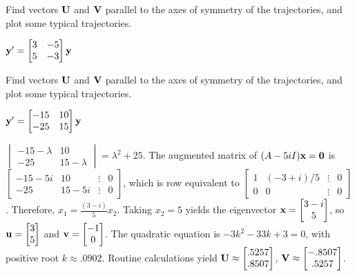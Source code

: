 \documentclass{ximera}
\begin{document}
 \begin{problem}\label{exer:10.6.29}
 Find vectors
${\bf U}$ and ${\bf V}$ parallel to the axes of symmetry of the
trajectories, and plot some typical trajectories.

$ {\bf y}'= \begin{bmatrix}3&-5\\5&-3\end{bmatrix}{\bf
y}$
\end{problem}

 \begin{problem}\label{exer:10.6.30}   
 Find vectors
${\bf U}$ and ${\bf V}$ parallel to the axes of symmetry of the
trajectories, and plot some typical trajectories.

$ {\bf y}'= \begin{bmatrix}-15&10\\-25&15\end{bmatrix}{\bf y}$

\begin{solution}
    $\begin{vmatrix}-15-\lambda&10\\-25&15-\lambda
\end{vmatrix}=\lambda^2+25$.
The augmented matrix of $(A-5iI){\bf x}={\bf 0}$ is
$\begin{bmatrix}-15-5i&10&\vdots&0\\
-25&15-5i&\vdots&0 \end{bmatrix}$,
which is row equivalent to
$\begin{bmatrix} 1&(-3+i)/5&\vdots&0\\ 0&0&\vdots&0
\end{bmatrix}$.
Therefore, $x_1=\frac{(3-i)}{5}x_2$. Taking $x_2=5$
yields the eigenvector
 ${\bf x}=\begin{bmatrix}3-i\\5\end{bmatrix}$,
so ${\bf u}=  \begin{bmatrix}3\\5\end{bmatrix}$ and ${\bf v}=  \begin{bmatrix}-1\\0\end{bmatrix}$.
The quadratic equation is $-3k^2-33k+3=0$, with positive root
$k\approx.0902$.
 Routine calculations yield
 ${\bf U}\approx  \begin{bmatrix}.5257\\.8507\end{bmatrix}$,
${\bf V}\approx  \begin{bmatrix}-.8507\\.5257\end{bmatrix}$.
\end{solution}
 \end{problem}
 
\end{document}
